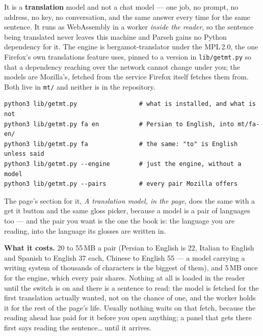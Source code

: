 \documentclass[11pt,oneside]{report}
\newcommand{\file}[1]{\texttt{#1}}
\newcommand{\menu}[1]{\textsf{#1}}
\begin{document}
It is a \textbf{translation} model and not a chat model --- one job, no
prompt, no address, no key, no conversation, and the same answer every time
for the same sentence. It runs as WebAssembly in a worker \emph{inside the
reader}, so the sentence being translated never leaves this machine and
Parseh gains no Python dependency for it. The engine is bergamot-translator
under the MPL\,2.0, the one Firefox's own translations feature uses, pinned
to a version in \file{lib/getmt.py} so that a dependency reaching over the
network cannot change under you; the models are Mozilla's, fetched from the
service Firefox itself fetches them from. Both live in \file{mt/} and neither
is in the repository.

\begin{lstlisting}
python3 lib/getmt.py                 # what is installed, and what is not
python3 lib/getmt.py fa en           # Persian to English, into mt/fa-en/
python3 lib/getmt.py fa              # the same: "to" is English unless said
python3 lib/getmt.py --engine        # just the engine, without a model
python3 lib/getmt.py --pairs         # every pair Mozilla offers
\end{lstlisting}

\noindent The page's section for it, \emph{A translation model, in the page},
does the same with a \menu{get it} button and the same gloss picker, because a model is a pair of languages
too --- and the pair you want is the one the book is: the language you are
reading, into the language its glosses are written in.

\textbf{What it costs.} 20 to 55\,MB a pair (Persian to English is 22,
Italian to English and Spanish to English 37 each, Chinese to English 55 ---
a model carrying a writing system of thousands of characters is the biggest
of them), and 5\,MB once for the engine, which every pair shares. Nothing at
all is loaded in the reader until the switch is on and there is a sentence to
read: the model is fetched for the first translation actually wanted, not on
the chance of one, and the worker holds it for the rest of the page's life.
Usually nothing waits on that fetch, because the reading ahead has paid for
it before you open anything; a panel that gets there first says
\menu{reading the sentence\ldots} until it arrives.
\end{document}
